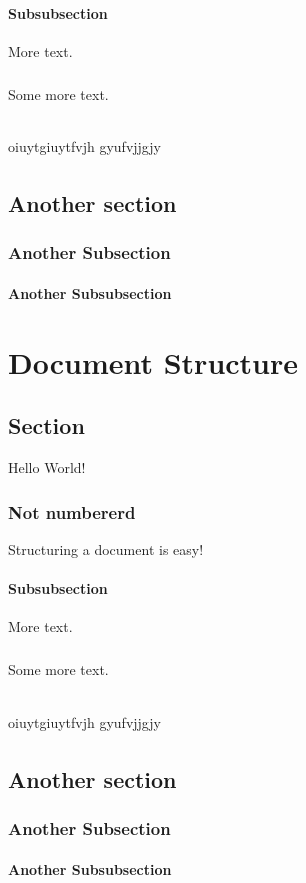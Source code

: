 \documentclass{book}
\begin{document}
	\subsubsection{Subsubsection}
	More text.
	\paragraph{}
	Some more text.
	\subparagraph{}
	oiuytgiuytfvjh gyufvjjgjy
	
	\subparagraph{}
	\lipsum[1]
	\section{Another section}
	\subsection{Another Subsection}
	\subsubsection{Another Subsubsection}
	\lipsum[1-3]\chapter{Document Structure}
	\section{Section}
	Hello World!
	\subsection*{Not numbererd}
	Structuring a document is easy!
	\subsubsection{Subsubsection}
	More text.
	\paragraph{}
	Some more text.
	\subparagraph{}
	oiuytgiuytfvjh gyufvjjgjy
	
	\subparagraph{}
	\lipsum[1]
	\section{Another section}
	\subsection{Another Subsection}
	\subsubsection{Another Subsubsection}
	\lipsum[1-3]
\end{document}
